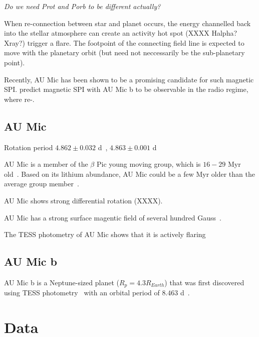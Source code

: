 \documentclass[fleqn,usenatbib,letters]{mnras}%
\begin{document}
\textit{Do we need Prot and Porb to be different actually?}

When re-connection between star and planet occurs, the energy channelled back into the stellar atmosphere can create an activity hot spot (XXXX Halpha? Xray?) trigger a flare. The footpoint of the connecting field line is expected to move with the planetary orbit (but need not neccessarily be the sub-planetary point).

Recently, AU Mic has been shown to be a promising candidate for such magnetic SPI. \citet{kavanagh2021} predict magnetic SPI with AU Mic b to be observable in the radio regime, where re-.  



\subsection{AU Mic}
Rotation period $4.862\pm 0.032$ d~\citep{martioli2021}, $4.863\pm 0.001$ d~\citep{plavchan2020}

AU Mic is a member of the $\beta$ Pic young moving group, which is $16-29$ Myr old~\citep{malo2014,binks2014,mamajek2014,bell2015,binks2016,shkolnik2017,miretroig2020}. Based on its lithium abundance, AU Mic could be a few Myr older than the average group member~\citep{malo2014}. 

AU Mic shows strong differential rotation (XXXX).

AU Mic has a strong surface magentic field of several hundred Gauss~\citep{klein2021}.

The TESS photometry of AU Mic shows that it is actively flaring~\citep{martioli2021}
\subsection{AU Mic b}
AU Mic b is a Neptune-sized planet ($R_p = 4.3R_{Earth}$) that was first discovered using TESS photometry~\citep{plavchan2020} with an orbital period of $8.463$ d~\citep{plavchan2020,martioli2021}.
\section{Data}
\end{document}

